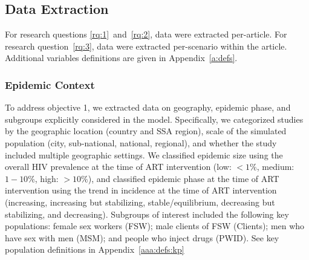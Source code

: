 \subsection{Data Extraction}
\label{ss:meth:data}
For research questions \ref{rq:1}~and~\ref{rq:2}, data were extracted per-article.
For research question~\ref{rq:3}, data were extracted per-scenario within the article.
Additional variables definitions are given in Appendix~\ref{a:defs}.
\subsubsection{Epidemic Context} %
\label{sss:meth:context}
To address objective 1, we extracted data on geography, epidemic phase, and subgroups explicitly considered in the model.
Specifically, we categorized studies by the geographic location (country and SSA region), 
scale of the simulated population (city, sub-national, national, regional), and 
whether the study included multiple geographic settings.
We classified epidemic size using  
the overall HIV prevalence at the time of ART intervention (low: $<1\%$, medium: $1-10\%$, high: $>10\%$),  %
and classified epidemic phase at the time of ART intervention 
using the trend in incidence at the time of ART intervention %
(increasing, increasing but stabilizing, stable/equilibrium,
decreasing but stabilizing, and decreasing).  %
Subgroups of interest included the following key populations:
female sex workers (FSW);
male clients of FSW (Clients);
men who have sex with men (MSM); and
people who inject drugs (PWID).
See key population definitions in Appendix~\ref{aaa:defs:kp}
